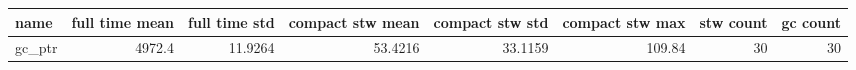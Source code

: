 \begin{tabular}{lrrrrrrr}
\hline
 name   &   full time mean &   full time std &   compact stw mean &   compact stw std &   compact stw max &   stw count &   gc count \\
\hline
 gc\_ptr &           4972.4 &         11.9264 &            53.4216 &           33.1159 &            109.84 &          30 &         30 \\
\hline
\end{tabular}